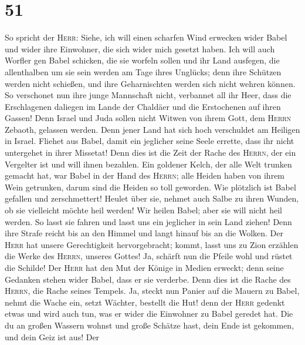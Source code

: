 \hypertarget{section-50}{%
\section{51}\label{section-50}}

 So spricht der \textsc{Herr}: Siehe, ich will einen
scharfen Wind erwecken wider Babel und wider ihre Einwohner, die sich
wider mich gesetzt haben.  Ich will auch Worfler gen Babel
schicken, die sie worfeln sollen und ihr Land ausfegen, die allenthalben
um sie sein werden am Tage ihres Unglücks;  denn ihre
Schützen werden nicht schießen, und ihre Geharnischten werden sich nicht
wehren können. So verschonet nun ihre junge Mannschaft nicht, verbannet
all ihr Heer,  dass die Erschlagenen daliegen im Lande der
Chaldäer und die Erstochenen auf ihren Gassen!  Denn
Israel und Juda sollen nicht Witwen von ihrem Gott, dem \textsc{Herrn}
Zebaoth, gelassen werden. Denn jener Land hat sich hoch verschuldet am
Heiligen in Israel.  Fliehet aus Babel, damit ein
jeglicher seine Seele errette, dass ihr nicht untergehet in ihrer
Missetat! Denn dies ist die Zeit der Rache des \textsc{Herrn}, der ein
Vergelter ist und will ihnen bezahlen.  Ein goldener
Kelch, der alle Welt trunken gemacht hat, war Babel in der Hand des
\textsc{Herrn}; alle Heiden haben von ihrem Wein getrunken, darum sind
die Heiden so toll geworden.  Wie plötzlich ist Babel
gefallen und zerschmettert! Heulet über sie, nehmet auch Salbe zu ihren
Wunden, ob sie vielleicht möchte heil werden!  Wir heilen
Babel; aber sie will nicht heil werden. So lasst sie fahren und lasst
uns ein jeglicher in sein Land ziehen! Denn ihre Strafe reicht bis an
den Himmel und langt hinauf bis an die Wolken.  Der
\textsc{Herr} hat unsere Gerechtigkeit hervorgebracht; kommt, lasst uns
zu Zion erzählen die Werke des \textsc{Herrn}, unseres Gottes!
 Ja, schärft nun die Pfeile wohl und rüstet die Schilde!
Der \textsc{Herr} hat den Mut der Könige in Medien erweckt; denn seine
Gedanken stehen wider Babel, dass er sie verderbe. Denn dies ist die
Rache des \textsc{Herrn}, die Rache seines Tempels.  Ja,
steckt nun Panier auf die Mauern zu Babel, nehmt die Wache ein, setzt
Wächter, bestellt die Hut! denn der \textsc{Herr} gedenkt etwas und wird
auch tun, was er wider die Einwohner zu Babel geredet hat.
 Die du an großen Wassern wohnst und große Schätze hast,
dein Ende ist gekommen, und dein Geiz ist aus!  Der
